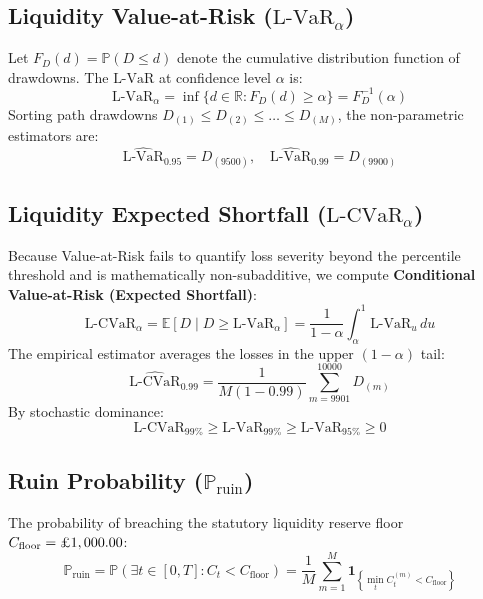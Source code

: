 \documentclass[11pt,a4paper]{article}
\begin{document}
\subsection{Liquidity Value-at-Risk ($\text{L-VaR}_{\alpha}$)}
Let $F_D(d) = \mathbb{P}(D \le d)$ denote the cumulative distribution function of drawdowns. The $\text{L-VaR}$ at confidence level $\alpha$ is:
\begin{equation}
\text{L-VaR}_{\alpha} = \inf \{ d \in \mathbb{R} : F_D(d) \ge \alpha \} = F_D^{-1}(\alpha)
\end{equation}
Sorting path drawdowns $D_{(1)} \le D_{(2)} \le \dots \le D_{(M)}$, the non-parametric estimators are:
\begin{equation}
\widehat{\text{L-VaR}}_{0.95} = D_{(9500)}, \quad \widehat{\text{L-VaR}}_{0.99} = D_{(9900)}
\end{equation}

\subsection{Liquidity Expected Shortfall ($\text{L-CVaR}_{\alpha}$)}
Because Value-at-Risk fails to quantify loss severity beyond the percentile threshold and is mathematically non-subadditive, we compute \textbf{Conditional Value-at-Risk (Expected Shortfall)}:
\begin{equation}
\text{L-CVaR}_{\alpha} = \mathbb{E}\left[ D \mid D \ge \text{L-VaR}_{\alpha} \right] = \frac{1}{1 - \alpha} \int_{\alpha}^1 \text{L-VaR}_u \, du
\end{equation}
The empirical estimator averages the losses in the upper $(1 - \alpha)$ tail:
\begin{equation}
\widehat{\text{L-CVaR}}_{0.99} = \frac{1}{M(1 - 0.99)} \sum_{m = 9901}^{10000} D_{(m)}
\end{equation}
By stochastic dominance:
\begin{equation}
\text{L-CVaR}_{99\%} \ge \text{L-VaR}_{99\%} \ge \text{L-VaR}_{95\%} \ge 0
\end{equation}

\subsection{Ruin Probability ($\mathbb{P}_{\text{ruin}}$)}
The probability of breaching the statutory liquidity reserve floor $C_{\text{floor}} = \text{\pounds}1,000.00$:
\begin{equation}
\mathbb{P}_{\text{ruin}} = \mathbb{P}\left(\exists t \in [0, T] : C_t < C_{\text{floor}}\right) = \frac{1}{M} \sum_{m=1}^M \mathbf{1}_{\left\{ \min_t C_t^{(m)} < C_{\text{floor}} \right\}}
\end{equation}
\end{document}
